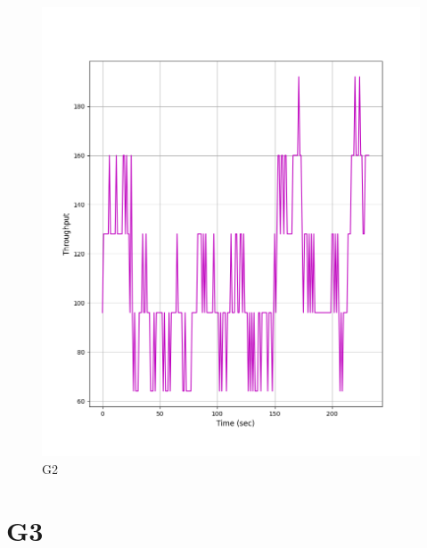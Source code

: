 \documentclass[hidelinks, 12pt, a4paper]{article}
\begin{document}
\begin{figure}[h!]
\centering
	\includegraphics[height=.38\textheight, width=\textwidth]{assets/session1/g2.png}
	\caption{G2} 
\end{figure}


\section{G3}
\end{document}
